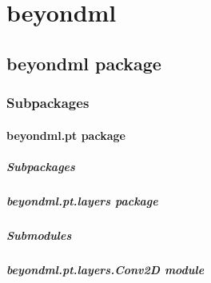 \documentclass[letterpaper,10pt,english]{sphinxmanual}
\begin{document}
\sphinxstepscope


\section{beyondml}
\label{\detokenize{modules:beyondml}}\label{\detokenize{modules::doc}}
\sphinxstepscope


\subsection{beyondml package}
\label{\detokenize{beyondml:beyondml-package}}\label{\detokenize{beyondml::doc}}

\subsubsection{Subpackages}
\label{\detokenize{beyondml:subpackages}}
\sphinxstepscope


\paragraph{beyondml.pt package}
\label{\detokenize{beyondml.pt:beyondml-pt-package}}\label{\detokenize{beyondml.pt::doc}}

\subparagraph{Subpackages}
\label{\detokenize{beyondml.pt:subpackages}}
\sphinxstepscope


\subparagraph{beyondml.pt.layers package}
\label{\detokenize{beyondml.pt.layers:beyondml-pt-layers-package}}\label{\detokenize{beyondml.pt.layers::doc}}

\subparagraph{Submodules}
\label{\detokenize{beyondml.pt.layers:submodules}}

\subparagraph{beyondml.pt.layers.Conv2D module}
\label{\detokenize{beyondml.pt.layers:module-beyondml.pt.layers.Conv2D}}\label{\detokenize{beyondml.pt.layers:beyondml-pt-layers-conv2d-module}}
\end{document}
